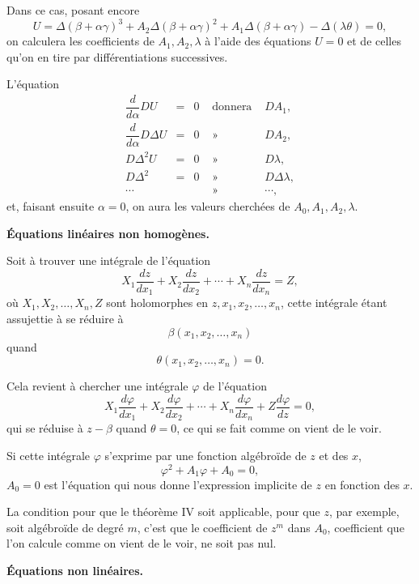 \documentclass[11pt]{article}
\begin{document}
Dans ce cas, posant encore
\[
U=\Delta(\beta+\alpha\gamma)^3+A_2\Delta(\beta+\alpha\gamma)^2+A_1\Delta(\beta+\alpha\gamma)-\Delta(\lambda\theta)=0,
\]
on calculera les coefficients de $A_1,A_2,\lambda$ à l’aide des équations $U=0$ et de celles qu’on en tire par différentiations successives.

L’équation
\[
\begin{array}{rclcl}
\dfrac{d}{d\alpha}DU&=&0&\text{ donnera }&DA_1,\\[0.2em]
\dfrac{d}{d\alpha}D\Delta U&=&0&\text{ » }&DA_2,\\
D\Delta^2U&=&0&\text{ » }&D\lambda,\\
D\Delta^2&=&0&\text{ » }&D\Delta\lambda,\\
\cdots&&&\text{ » }&\cdots,
\end{array}
\]
et, faisant ensuite $\alpha=0$, on aura les valeurs cherchées de $A_0,A_1,A_2,\lambda$.

\begin{center}
{\bfseries Équations linéaires non homogènes.}
\end{center}

Soit à trouver une intégrale de l’équation
\[
X_1\frac{dz}{dx_1}+X_2\frac{dz}{dx_2}+\cdots+X_n\frac{dz}{dx_n}=Z,
\]
où $X_1,X_2,\ldots,X_n,Z$ sont holomorphes en $z,x_1,x_2,\ldots,x_n$, cette intégrale étant assujettie à se réduire à
\[
\beta(x_1,x_2,\ldots,x_n)
\]
quand
\[
\theta(x_1,x_2,\ldots,x_n)=0.
\]

Cela revient à chercher une intégrale $\varphi$ de l’équation
\[
X_1\frac{d\varphi}{dx_1}+X_2\frac{d\varphi}{dx_2}+\cdots+X_n\frac{d\varphi}{dx_n}
+Z\frac{d\varphi}{dz}=0,
\]
qui se réduise à $z-\beta$ quand $\theta=0$, ce qui se fait comme on vient de le voir.

Si cette intégrale $\varphi$ s’exprime par une fonction algébroïde de $z$ et des $x$,
\[
\varphi^2+A_1\varphi+A_0=0,
\]
$A_0=0$ est l’équation qui nous donne l’expression implicite de $z$ en fonction des $x$.

La condition pour que le théorème IV soit applicable, pour que $z$, par exemple, soit algébroïde de degré $m$, c’est que le coefficient de $z^m$ dans $A_0$, coefficient que l’on calcule comme on vient de le voir, ne soit pas nul.

\begin{center}
{\bfseries Équations non linéaires.}
\end{center}
\end{document}
